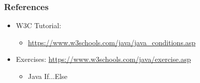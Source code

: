 \documentclass{beamer}
\begin{document}
	\begin{frame}
		\frametitle{References}
		\begin{itemize}
			\item W3C Tutorial: 
			\begin{itemize}
				\item \url{https://www.w3schools.com/java/java_conditions.asp}
			\end{itemize}
			\item Exercises: \url{https://www.w3schools.com/java/exercise.asp}
			\begin{itemize}
				\item Java If...Else
			\end{itemize}
		\end{itemize}
		
	\end{frame}
\end{document}
